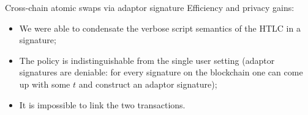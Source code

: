 \documentclass[slidescentered]{beamer}
\newcommand{\backupend}{
	\addtocounter{framenumberappendix}{-\value{framenumber}}
	\addtocounter{framenumber}{\value{framenumberappendix}} 
}
\begin{document}
	\begin{frame}{Cross-chain atomic swaps via adaptor signature}
		Efficiency and privacy gains:
		\begin{itemize}
			\item We were able to condensate the verbose script semantics of the HTLC in a signature;
			\item The policy is indistinguishable from the single user setting (adaptor signatures are deniable: for every signature on the blockchain one can come up with some $t$ and construct an adaptor signature);
			\item It is impossible to link the two transactions.
		\end{itemize}
	\end{frame}

	\backupend
\end{document}
